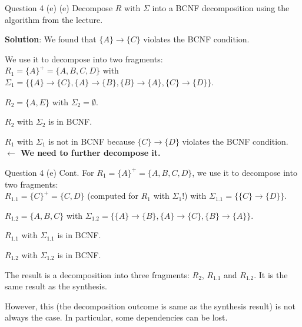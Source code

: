 \begin{frame}[fragile]{Question 4 (e)}
(e) Decompose $R$ with $\Sigma$ into a BCNF decomposition using the algorithm from the lecture.\\\vspace{5pt}

\textbf{Solution}: We found that $\{A\} \rightarrow \{C\}$ violates the BCNF condition.\\\vspace{3pt}

We use it to decompose into two fragments:\\
$R_1 = \{A\}^{+} = \{A, B, C, D\}$ with $\Sigma_1 = \{\{A\} \rightarrow \{C\}, \{A\} \rightarrow \{B\},\{B\} \rightarrow \{A\}, \{C\} \rightarrow \{D\}\}$.

$R_2 = \{A, E\}$ with $\Sigma_2 = \emptyset$.

$R_2$ with $\Sigma_2$ is in BCNF.

$R_1$ with $\Sigma_1$ is not in BCNF because $\{C\} \rightarrow \{D\}$ violates the BCNF condition.
\textbf{$\leftarrow$ We need to further decompose it.}
\end{frame}

\begin{frame}[fragile]{Question 4 (e) Cont.}
For $R_1 = \{A\}^{+} = \{A, B, C, D\}$, we use it to decompose into two fragments:\\\vspace{5pt}
$R_{1.1} = \{C\}^{+} = \{C, D\}$ (computed for $R_1$ with $\Sigma_1$!) with $\Sigma_{1.1} = \{\{C\} \rightarrow \{D\}\}$.

$R_{1.2} = \{A, B, C\}$ with $\Sigma_{1.2} = \{\{A\} \rightarrow \{B\}, \{A\} \rightarrow \{C\}, \{B\} \rightarrow \{A\}\}$.\\\vspace{5pt}

$R_{1.1}$ with $\Sigma_{1.1}$ is in BCNF.

$R_{1.2}$ with $\Sigma_{1.2}$ is in BCNF.\\\vspace{5pt}

The result is a decomposition into three fragments: $R_2$, $R_{1.1}$ and $R_{1.2}$. It is the same result as the synthesis.\\\vspace{5pt}

However, this (the decomposition outcome is same as the synthesis result) is not always the case. In particular, some dependencies can be lost.
\end{frame}

